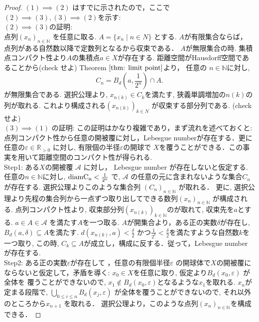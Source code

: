 \documentclass[dvipdfmx]{jbook}
\theoremstyle{remark}
\theoremstyle{plain}
\begin{document}
\begin{proof}
	$(1) \implies (2)$ はすでに示されたので，ここで$(2) \implies (3) , (3) \implies (2)$を示す:\\
	$(2) \implies (3)$の証明:\\
	点列$(x_n)_{n \in \mathbb{N}}$ を任意に取る. $A = \{x_n  \mid n \in N\} $ とする.
	 $A$が有限集合ならば， 点列がある自然数以降で定数列となるから収束である．
	  $A$が無限集合の時.  集積点コンパクト性より$A$の集積点$a \in X$が存在する.
	  距離空間がHausdorff空間であることから(check せよ)
	  Theorem $\ref{thm: limit point}$より， 任意の $n \in \mathbb{N}$に対し,
	  \[
	 C_n =  B_d(a, \frac{1}{2^{n}}) \cap A
	  .\] 
	  が無限集合である. 選択公理より,  $x_{n(k)} \in C_k$を満たす, 狭義単調増加の$n(k)$の列が取れる.
	  これより構成される$(x_{n(k)})_{k \in N}$ が収束する部分列である. (check せよ)\\
	  $(3) \implies (1) $ の証明: この証明はかなり複雑であり，まず流れを述べておくと:
	  点列コンパクト性から任意の開被覆に対し，Lebesgue numberが存在する．更に任意の$\varepsilon \in \mathbb{R}_{>0}$ に対し, 有限個の半径$\varepsilon$の開球で $X$を覆うことができる．この事実を用いて距離空間のコンパクト性が得られる.\\
	Step1: ある$X$の開被覆 $\mathcal{A}$ に対し，
	Lebesgue number が存在しないと仮定する. 
	任意の$n \in \mathbb{N}$に対し, 
	$\rm{diam}C_n<\frac{1}{2^{n}}$ で,
	$\mathcal{A}$ の任意の元に含まれないような集合$C_n$が存在する.  
	選択公理よりこのような集合列 $(C_n)_{n \in \mathbb{N}}$ が取れる．
	更に, 選択公理より先程の集合列から一点ずつ取り出してできる数列$(x_n)_{n \in \mathbb{N}}$ が構成される.
	点列コンパクト性より, 
	収束部分列$\left( x_{n(k)} \right) _{k \in \mathbb{N}}$のが取れて, 
	収束先を$a$とする.  
	$a \in A \in \mathcal{A} $ を満たす$A$を一つ取る.  
	$A$が開集合より，ある正の実数$\delta$が存在し,  $B_d (a, \delta) \subseteq A$を満たす. 
	$d(x_{n(k)},a)< \frac{\delta}{2}$ かつ$\frac{1}{2^{k} } < \frac{\delta}{2}$を満たすような自然数$k$を一つ取り, 
	この時,  $C_k \subseteq A$が成立し，構成に反する．従って，Lebesgue number が存在する.\\
	Step2: ある正の実数$\varepsilon$が存在して ，任意の有限個半径$\varepsilon$ の開球体で$X$の開被覆にならないと仮定して，矛盾を導く: 
	$x_0 \in X$を任意に取り, 仮定より$B_d\left( x_0 , \varepsilon \right) $ が全体を
	覆うことができないので, $x_1 \not\in  B_d(x_0 ,\varepsilon)$となるような$x_1$を取れる.
	 $x_n$が定まる段階で,  $\bigcup_{0 \le i \le n} B_d(x_j,\varepsilon)$ が全体を覆うことができないので, それ以外のところから$x_{n+1}$ を取れる．
	 選択公理より，このような点列$\left( x_n \right) _{n \in  \mathbb{N}}$を構成できる．

\end{proof}
\end{document}
